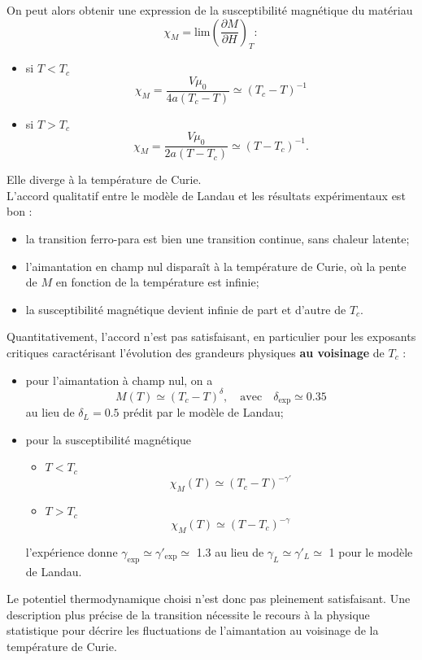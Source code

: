 \documentclass[11pt,a4paper]{report}
\begin{document}
On peut alors obtenir une expression de la susceptibilité magnétique du matériau
\begin{equation}
	\chi_M = \text{lim}\left(\frac{\partial M}{\partial H}\right)_T :
\end{equation}
\begin{itemize}
	\item si $T < T_c$
	\begin{equation}
		\chi_M = \frac{V \mu_0}{4a(T_c-T)} \simeq (T_c-T)^{-1}
	\end{equation}
	\item si $T > T_c$
	\begin{equation}
		\chi_M = \frac{V \mu_0}{2a(T-T_c)} \simeq (T-T_c)^{-1}.
	\end{equation}
\end{itemize}
Elle diverge à la température de Curie.\\

L'accord qualitatif entre le modèle de Landau et les résultats expérimentaux est bon :
\begin{itemize}
	\item la transition ferro-para est bien une transition continue, sans chaleur latente;
	\item l'aimantation en champ nul disparaît à la température de Curie, où la pente de $M$ en 			fonction de la température est infinie;
	\item la susceptibilité magnétique devient infinie de part et d'autre de $T_c$.
\end{itemize}

Quantitativement, l'accord n'est pas satisfaisant, en particulier pour les exposants critiques caractérisant l'évolution des grandeurs physiques \textbf{au voisinage} de $T_c$ :
\begin{itemize}
	\item pour l'aimantation à champ nul, on a
		\begin{equation}
			M(T) \simeq (T_c - T)^\delta,\quad\text{avec}\quad \delta_\text{exp} \simeq 0.35
		\end{equation}
		au lieu de $\delta_L = 0.5$ prédit par le modèle de Landau;
	\item pour la susceptibilité magnétique
		\begin{itemize}
			\item $T < T_c$
				\begin{equation}
					\chi_M(T) \simeq (T_c - T)^{-\gamma'}
				\end{equation}
			\item $T > T_c$
				\begin{equation}
					\chi_M(T) \simeq (T - T_c)^{-\gamma}
				\end{equation}
		\end{itemize}
		l'expérience donne $\gamma_\text{exp} \simeq \gamma'_\text{exp} \simeq$ 1.3 
		au lieu de $\gamma_L \simeq \gamma'_L \simeq$ 1 pour le modèle de Landau.\\
\end{itemize}

Le potentiel thermodynamique choisi n'est donc pas pleinement satisfaisant. Une description plus précise de la transition nécessite le recours à la physique statistique pour décrire les fluctuations de l'aimantation au voisinage de la température de Curie.
\end{document}
